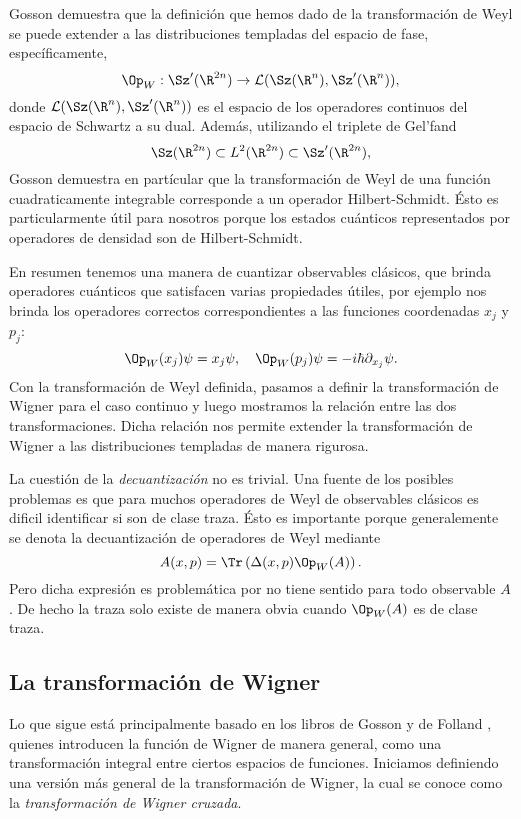   Gosson demuestra que la definición que hemos dado de la
  transformación de Weyl se puede extender a las
  distribuciones templadas del espacio de fase,
  específicamente, 
  \[
    \Op_W : \Sz'(\R^{2n}) \to \mathcal
    L(\Sz(\R^{n}),\Sz'(\R^{n})),
  \]
  donde $\mathcal L(\Sz(\R^{n}),\Sz'(\R^{n}))$ es el espacio
  de los operadores continuos del espacio de Schwartz a su
  dual. Además, utilizando el triplete de Gel'fand
  \[
    \Sz(\R^{2n})
    \subset L^2(\R^{2n})
    \subset \Sz'(\R^{2n}),
  \]
  Gosson demuestra en partícular que la transformación de
  Weyl de una función cuadraticamente integrable corresponde
  a un operador Hilbert-Schmidt. Ésto es particularmente
  útil para nosotros porque los estados cuánticos
  representados por operadores de densidad son de
  Hilbert-Schmidt.

  En resumen tenemos una manera de cuantizar observables
  clásicos, que brinda operadores cuánticos que satisfacen
  varias propiedades útiles, por ejemplo nos brinda los
  operadores correctos correspondientes a las funciones
  coordenadas
  $x_j$ y $p_j$:
  \begin{equation}
    \Op_W(x_j)\psi = x_j\psi,
    \quad
    \Op_W(p_j)\psi = -i\hbar \partial_{x_j}\psi.
  \end{equation}
  Con la transformación de Weyl definida, pasamos a definir
  la transformación de Wigner para el caso continuo y luego
  mostramos la relación entre las dos transformaciones.
  Dicha relación nos permite extender la transformación de
  Wigner a las distribuciones templadas de manera rigurosa.

  La cuestión de la \textit{decuantización} no es trivial.
  Una fuente de los posibles problemas es que para muchos
  operadores de Weyl de observables clásicos es dificil
  identificar si son de clase traza. Ésto es importante
  porque generalemente se denota la decuantización de
  operadores de Weyl mediante
  \[
    A(x,p)
    = \Tr\left( \Delta(x,p) \Op_W(A) \right). 
  \] 
  Pero dicha expresión es problemática por no tiene sentido
  para todo observable $A$. De hecho la traza solo existe de
  manera obvia cuando $\Op_W(A)$ es de clase traza.

  

  

  \subsection{La transformación de Wigner}

  Lo que sigue está principalmente basado en los libros de
  Gosson \cite{gossonWignerTransform2017} y de Folland
  \cite{follandHarmonicAnalysisPhase1989}, quienes
  introducen la función de Wigner de manera general, como
  una transformación integral entre ciertos espacios de
  funciones. Iniciamos definiendo una versión más general de
  la transformación de Wigner, la cual se conoce como la
  \textit{transformación de Wigner cruzada}. 

